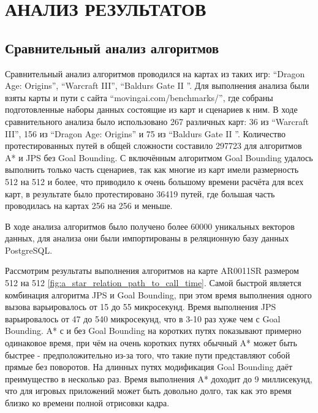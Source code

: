 \section[Анализ результатов]{\MakeTextUppercase{АНАЛИЗ РЕЗУЛЬТАТОВ}}

\subsection{Сравнительный анализ алгоритмов}

Сравнительный анализ алгоритмов проводился на картах из таких игр: ``Dragon Age: Origins'', ``Warcraft III'', ``Baldurs Gate II ''. Для выполнения анализа были взяты карты и пути с сайта ``movingai.com/benchmarks/'', где собраны подготовленные наборы данных состоящие из карт и сценариев к ним. В ходе сравнительного анализа было использовано 267 различных карт: 36 из ``Warcraft III'', 156 из ``Dragon Age: Origins'' и 75 из ``Baldurs Gate II ''. Количество протестированных путей в общей сложности составило 297723 для алгоритмов A* и JPS без Goal Bounding. С включённым алгоритмом Goal Bounding удалось выполнить только часть сценариев, так как многие из карт имели размерность 512 на 512 и более, что приводило к очень большому времени расчёта для всех карт, в результате было протестировано 36419 путей, где большая часть проводилась на картах 256 на 256 и меньше.

В ходе анализа алгоритмов было получено более 60000 уникальных векторов данных, для анализа они были импортированы в реляционную базу данных PostgreSQL.

Рассмотрим результаты выполнения алгоритмов на карте AR0011SR размером 512 на 512 \cref{fig:a_star_relation_path_to_call_time}. Самой быстрой является комбинация алгоритма JPS и Goal Bounding, при этом время выполнения одного вызова варьировалось от 15 до 55 микросекунд. Время выполнения JPS варьировалось от 47 до 540 микросекунд, что в 3-10 раз хуже чем с Goal Bounding. A* с и без Goal Bounding на коротких путях показывают примерно одинаковое время, при чём на очень коротких путях обычный A* может быть быстрее - предположительно из-за того, что такие пути представляют собой прямые без поворотов. На длинных путях модификация Goal Bounding даёт преимущество в несколько раз. Время выполнения A* доходит до 9 миллисекунд, что для игровых приложений может быть довольно долго, так как это время близко ко времени полной отрисовки кадра.

